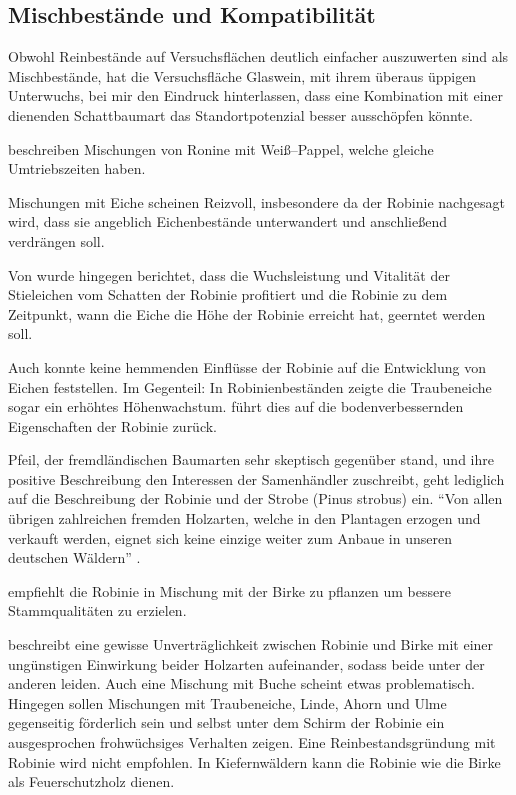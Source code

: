 \documentclass[twocolumn]{scrartcl}
\begin{document}
\subsection{Mischbestände und Kompatibilität}

Obwohl Reinbestände auf Versuchsflächen deutlich einfacher auszuwerten
sind als Mischbestände, hat die Versuchsfläche Glaswein, mit ihrem
überaus üppigen Unterwuchs, bei mir den Eindruck hinterlassen, dass
eine Kombination mit einer dienenden Schattbaumart das
Standortpotenzial besser ausschöpfen könnte.

\citet{redei2006robiniePappel} beschreiben Mischungen von Ronine mit
Weiß--Pappel, welche gleiche Umtriebszeiten haben.

Mischungen mit Eiche scheinen Reizvoll, insbesondere da der Robinie
nachgesagt wird, dass sie angeblich Eichenbestände unterwandert und
anschließend verdrängen soll.

Von \citet{kallina1888robinie} wurde hingegen berichtet, dass die
Wuchsleistung und Vitalität der Stieleichen vom Schatten der Robinie
profitiert und die Robinie zu dem Zeitpunkt, wann die Eiche die Höhe
der Robinie erreicht hat, geerntet werden soll.

Auch \citet{feher2024robinie} konnte keine hemmenden Einflüsse der
Robinie auf die Entwicklung von Eichen feststellen. Im Gegenteil: In
Robinienbeständen zeigte die Traubeneiche sogar ein erhöhtes
Höhenwachstum. \citet{foeldes1903robinie} führt dies auf die
bodenverbessernden Eigenschaften der Robinie zurück.

\citet[S.~174ff]{pfeil1829deutscheWaldbaeume} Pfeil, der
fremdländischen Baumarten sehr skeptisch gegenüber stand, und ihre
positive Beschreibung den Interessen der Samenhändler zuschreibt, geht
lediglich auf die Beschreibung der Robinie und der Strobe (Pinus
strobus) ein. \hypertarget{german:pfeil1860holzzucht}{\enquote{Von allen übrigen zahlreichen fremden
  Holzarten, welche in den Plantagen erzogen und verkauft werden,
  eignet sich keine einzige weiter zum Anbaue in unseren deutschen
  Wäldern}} \citep{pfeil1860holzzucht}.

\citet{pfeil1850robinie} empfiehlt die Robinie in Mischung mit der
Birke zu pflanzen um bessere Stammqualitäten zu erzielen.

\citet[S.~88--96]{erteld1952robinieErtrag} beschreibt eine gewisse
Unverträglichkeit zwischen Robinie und Birke mit einer ungünstigen
Einwirkung beider Holzarten aufeinander, sodass beide unter der
anderen leiden. Auch eine Mischung mit Buche scheint etwas
problematisch. Hingegen sollen Mischungen mit Traubeneiche, Linde,
Ahorn und Ulme gegenseitig förderlich sein und selbst unter dem Schirm
der Robinie ein ausgesprochen frohwüchsiges Verhalten zeigen. Eine
Reinbestandsgründung mit Robinie wird nicht empfohlen. In
Kiefernwäldern kann die Robinie wie die Birke als Feuerschutzholz
dienen.
\end{document}
